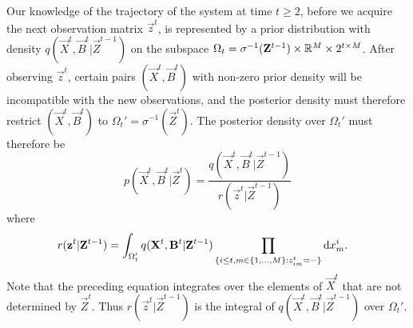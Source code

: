 Our knowledge of the trajectory of the system at time $t \geq 2$, before we acquire the next observation matrix $\vec{z}^t$, is represented by a prior distribution with density $q(\vec{X}^t, \vec{B}^t | \vec{Z}^{t-1})$ on the subspace $\Omega_t = \sigma^{-1}(\mathbf{Z}^{t-1}) \times \mathbb R^M \times 2^{t \times M}$. After observing $\vec{z}^t$, certain pairs $(\vec{X}^t, \vec{B}^t)$ with non-zero prior density will be incompatible with the new observations, and the posterior density must therefore restrict $(\vec{X}^t, \vec{B}^t)$ to $\Omega_t' = \sigma^{-1}(\vec{Z}^t)$. The posterior density over $\Omega_t'$ must therefore be
\begin{equation*}
    p(\vec{X}^t, \vec{B}^t |\vec{Z}^t) =
        \frac{q(\vec{X}^t, \vec{B}^t | \vec{Z}^{t-1})}
        {r(\vec{z}^t | \vec{Z}^{t-1})} 
\end{equation*}
where
\begin{align*}
    r(\mathbf{z}^t | \mathbf{Z}^{t-1})  &= \int_{\Omega_t'} q(\mathbf{X}^t, \mathbf{B}^t | \mathbf{Z}^{t-1}) \prod_{ \{ i \leq t, m \in \{1, \ldots, M \} : z^t_{im} = - \} } \operatorname{d}\!{x}^i_m.
\end{align*}
Note that the preceding equation integrates over the elements of $\vec{X}^t$ that are not determined by $\vec{Z}^t$. Thus $r(\vec{z}^t | \vec{Z}^{t-1})$ is the integral of $q(\vec{X}^t, \vec{B}^t | \vec{Z}^{t-1})$ over $\Omega_t'$. 

